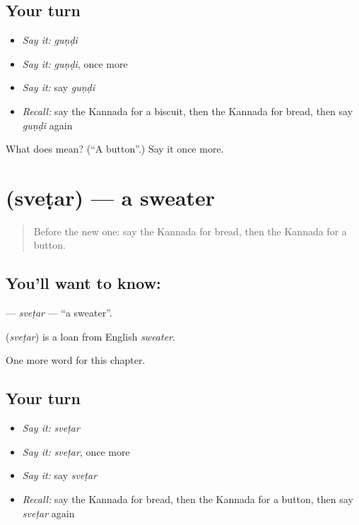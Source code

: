 \subsection*{Your turn}
\begin{itemize}
\raggedright
  \item \emph{Say it:} \emph{guṇḍi}
  \item \emph{Say it:} \emph{guṇḍi}, once more
  \item \emph{Say it:} say \emph{guṇḍi}
  \item \emph{Recall:} say the Kannada for a biscuit, then the Kannada for bread, then say \emph{guṇḍi} again
\end{itemize}

\begin{tcolorbox}[breakable,colback=teal!4,colframe=teal!35!black,title={Before you move on}]
What does  mean? (\textquotedblleft{}A button\textquotedblright{}.) Say it once more.
\end{tcolorbox}
\section[\texorpdfstring{\kn{ಸ್ವೆಟರ್} (sveṭar)}{ಸ್ವೆಟರ್ (sveṭar)}]{ (sveṭar) — a sweater}

\label{lesson:KA-C259-svetar}



\begin{quote}
Before the new one: say the Kannada for bread, then the Kannada for a button.
\end{quote}

\subsection*{You'll want to know: }
\textbf{} — \emph{sveṭar} — \textquotedblleft{}a sweater\textquotedblright{}.

\begin{cousinweb}
\textbf{} (\emph{sveṭar}) is a loan from English \emph{sweater}.
\end{cousinweb}

\begin{grammarlens}[title={What you've built}]
One more word for this chapter.
\end{grammarlens}

\subsection*{Your turn}
\begin{itemize}
\raggedright
  \item \emph{Say it:} \emph{sveṭar}
  \item \emph{Say it:} \emph{sveṭar}, once more
  \item \emph{Say it:} say \emph{sveṭar}
  \item \emph{Recall:} say the Kannada for bread, then the Kannada for a button, then say \emph{sveṭar} again
\end{itemize}

